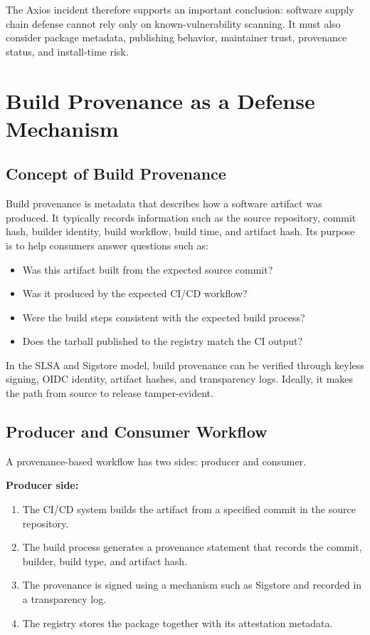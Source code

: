 \documentclass[12pt,a4paper]{article}
\begin{document}
The Axios incident therefore supports an important conclusion: software supply chain defense cannot rely only on known-vulnerability scanning. It must also consider package metadata, publishing behavior, maintainer trust, provenance status, and install-time risk.

\section{Build Provenance as a Defense Mechanism}

\subsection{Concept of Build Provenance}

Build provenance is metadata that describes how a software artifact was produced. It typically records information such as the source repository, commit hash, builder identity, build workflow, build time, and artifact hash. Its purpose is to help consumers answer questions such as:

\begin{itemize}
  \item Was this artifact built from the expected source commit?
  \item Was it produced by the expected CI/CD workflow?
  \item Were the build steps consistent with the expected build process?
  \item Does the tarball published to the registry match the CI output?
\end{itemize}

In the SLSA and Sigstore model, build provenance can be verified through keyless signing, OIDC identity, artifact hashes, and transparency logs. Ideally, it makes the path from source to release tamper-evident.

\subsection{Producer and Consumer Workflow}

A provenance-based workflow has two sides: producer and consumer.

\textbf{Producer side:}

\begin{enumerate}[label=(\arabic*)]
  \item The CI/CD system builds the artifact from a specified commit in the source repository.
  \item The build process generates a provenance statement that records the commit, builder, build type, and artifact hash.
  \item The provenance is signed using a mechanism such as Sigstore and recorded in a transparency log.
  \item The registry stores the package together with its attestation metadata.
\end{enumerate}
\end{document}
